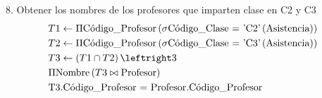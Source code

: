 \documentclass{article}
\begin{document}
\textnormal{8. Obtener los nombres de los profesores que imparten clase en C2 y C3}
\begin{equation*}
	\begin{flalign*}
		& T1 \leftarrow \Pi \text{Código\_Profesor} \left(\sigma \text{Código\_Clase = 'C2'} \left(\text{Asistencia}\right)\right) \\
		& T2 \leftarrow \Pi \text{Código\_Profesor} \left(\sigma \text{Código\_Clase = 'C3'} \left(\text{Asistencia}\right)\right) \\
		& T3 \leftarrow \left( T1 \cap T2\right) \leftright 3 \\
		& \Pi \text{Nombre} \left( T3 \bowtie \text{Profesor} \right) \\
		& \text{T3.Código\_Profesor = Profesor.Código\_Profesor}
	\end{flalign*}
\end{equation*}
\end{document}
